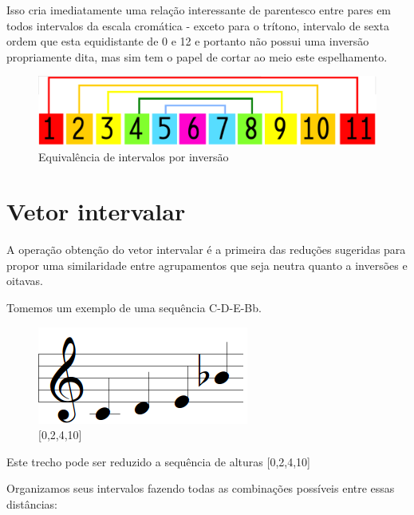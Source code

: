 \documentclass[
	12pt,				%
	openright,			%
	twoside,			%
	a4paper,			%
	english,			%
	french,				%
	spanish,			%
	brazil				%
	]{abntex2}
\begin{document}
\begin{apendicesenv}
Isso cria imediatamente uma relação interessante de parentesco entre pares em todos intervalos da escala cromática - exceto para o trítono, intervalo de sexta ordem que esta equidistante de 0 e 12 e portanto não possui uma inversão propriamente dita, mas sim tem o papel de cortar ao meio este espelhamento.

\begin{figure}[!h]
	\caption{\label{fig_grafico}Equivalência de intervalos por inversão }
	\begin{center}
	    \includegraphics[scale=0.3]{algo/equivalencia_inversa.png}
	\end{center}
\end{figure}


\section{Vetor intervalar}

A operação obtenção do vetor intervalar é a primeira das reduções sugeridas para propor uma similaridade entre agrupamentos que seja neutra quanto a inversões e oitavas.

Tomemos um exemplo de uma sequência C-D-E-Bb.



\begin{figure}[!h]
	\caption{\label{fig_grafico}[0,2,4,10] }
	\begin{center}
	    \includegraphics[scale=0.6]{OM_settheory/vetor02410.png}
	\end{center}
\end{figure}


Este trecho pode ser reduzido a sequência de alturas [0,2,4,10]

Organizamos seus intervalos fazendo todas as combinações possíveis entre essas distâncias:



\end{apendicesenv}
\end{document}
